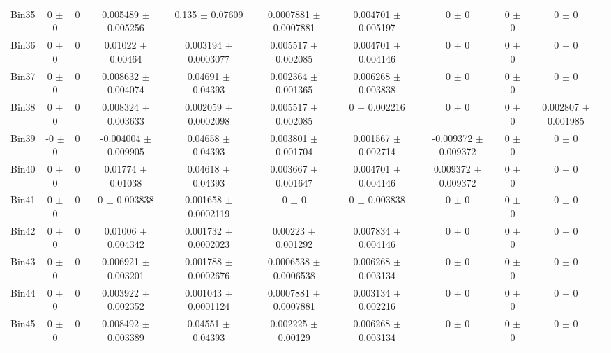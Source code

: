 \begin{tabular}{@{\extracolsep{4pt}}lccccccccc@{}}
     Bin35 & 0 $\pm$ 0 & 0 & 0.005489 $\pm$ 0.005256 & 0.135 $\pm$ 0.07609 & 0.0007881 $\pm$ 0.0007881 & 0.004701 $\pm$ 0.005197 & 0 $\pm$ 0 & 0 $\pm$ 0 & 0 $\pm$ 0 \\ 
     Bin36 & 0 $\pm$ 0 & 0 & 0.01022 $\pm$ 0.00464 & 0.003194 $\pm$ 0.0003077 & 0.005517 $\pm$ 0.002085 & 0.004701 $\pm$ 0.004146 & 0 $\pm$ 0 & 0 $\pm$ 0 & 0 $\pm$ 0 \\ 
     Bin37 & 0 $\pm$ 0 & 0 & 0.008632 $\pm$ 0.004074 & 0.04691 $\pm$ 0.04393 & 0.002364 $\pm$ 0.001365 & 0.006268 $\pm$ 0.003838 & 0 $\pm$ 0 & 0 $\pm$ 0 & 0 $\pm$ 0 \\ 
     Bin38 & 0 $\pm$ 0 & 0 & 0.008324 $\pm$ 0.003633 & 0.002059 $\pm$ 0.0002098 & 0.005517 $\pm$ 0.002085 & 0 $\pm$ 0.002216 & 0 $\pm$ 0 & 0 $\pm$ 0 & 0.002807 $\pm$ 0.001985 \\ 
     Bin39 & -0 $\pm$ 0 & 0 & -0.004004 $\pm$ 0.009905 & 0.04658 $\pm$ 0.04393 & 0.003801 $\pm$ 0.001704 & 0.001567 $\pm$ 0.002714 & -0.009372 $\pm$ 0.009372 & 0 $\pm$ 0 & 0 $\pm$ 0 \\ 
     Bin40 & 0 $\pm$ 0 & 0 & 0.01774 $\pm$ 0.01038 & 0.04618 $\pm$ 0.04393 & 0.003667 $\pm$ 0.001647 & 0.004701 $\pm$ 0.004146 & 0.009372 $\pm$ 0.009372 & 0 $\pm$ 0 & 0 $\pm$ 0 \\ 
     Bin41 & 0 $\pm$ 0 & 0 & 0 $\pm$ 0.003838 & 0.001658 $\pm$ 0.0002119 & 0 $\pm$ 0 & 0 $\pm$ 0.003838 & 0 $\pm$ 0 & 0 $\pm$ 0 & 0 $\pm$ 0 \\ 
     Bin42 & 0 $\pm$ 0 & 0 & 0.01006 $\pm$ 0.004342 & 0.001732 $\pm$ 0.0002023 & 0.00223 $\pm$ 0.001292 & 0.007834 $\pm$ 0.004146 & 0 $\pm$ 0 & 0 $\pm$ 0 & 0 $\pm$ 0 \\ 
     Bin43 & 0 $\pm$ 0 & 0 & 0.006921 $\pm$ 0.003201 & 0.001788 $\pm$ 0.0002676 & 0.0006538 $\pm$ 0.0006538 & 0.006268 $\pm$ 0.003134 & 0 $\pm$ 0 & 0 $\pm$ 0 & 0 $\pm$ 0 \\ 
     Bin44 & 0 $\pm$ 0 & 0 & 0.003922 $\pm$ 0.002352 & 0.001043 $\pm$ 0.0001124 & 0.0007881 $\pm$ 0.0007881 & 0.003134 $\pm$ 0.002216 & 0 $\pm$ 0 & 0 $\pm$ 0 & 0 $\pm$ 0 \\ 
     Bin45 & 0 $\pm$ 0 & 0 & 0.008492 $\pm$ 0.003389 & 0.04551 $\pm$ 0.04393 & 0.002225 $\pm$ 0.00129 & 0.006268 $\pm$ 0.003134 & 0 $\pm$ 0 & 0 $\pm$ 0 & 0 $\pm$ 0 \\ 
\hline\hline
  \end{tabular}
